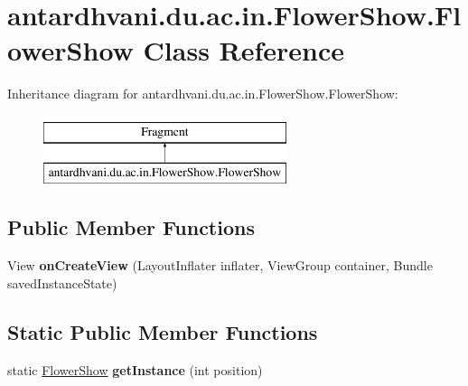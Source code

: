 \hypertarget{classantardhvani_1_1du_1_1ac_1_1in_1_1_flower_show_1_1_flower_show}{}\section{antardhvani.\+du.\+ac.\+in.\+Flower\+Show.\+Flower\+Show Class Reference}
\label{classantardhvani_1_1du_1_1ac_1_1in_1_1_flower_show_1_1_flower_show}
Inheritance diagram for antardhvani.\+du.\+ac.\+in.\+Flower\+Show.\+Flower\+Show\+:\begin{figure}[H]
\begin{center}
\leavevmode
\includegraphics[height=2.000000cm]{classantardhvani_1_1du_1_1ac_1_1in_1_1_flower_show_1_1_flower_show}
\end{center}
\end{figure}
\subsection*{Public Member Functions}
\begin{DoxyCompactItemize}
\item 
\hypertarget{classantardhvani_1_1du_1_1ac_1_1in_1_1_flower_show_1_1_flower_show_a910f1fcce02fca66aa707c23190f8af4}{}View {\bfseries on\+Create\+View} (Layout\+Inflater inflater, View\+Group container, Bundle saved\+Instance\+State)\label{classantardhvani_1_1du_1_1ac_1_1in_1_1_flower_show_1_1_flower_show_a910f1fcce02fca66aa707c23190f8af4}

\end{DoxyCompactItemize}
\subsection*{Static Public Member Functions}
\begin{DoxyCompactItemize}
\item 
\hypertarget{classantardhvani_1_1du_1_1ac_1_1in_1_1_flower_show_1_1_flower_show_a75a29da2edfd92d395852765778a905e}{}static \hyperlink{classantardhvani_1_1du_1_1ac_1_1in_1_1_flower_show_1_1_flower_show}{Flower\+Show} {\bfseries get\+Instance} (int position)\label{classantardhvani_1_1du_1_1ac_1_1in_1_1_flower_show_1_1_flower_show_a75a29da2edfd92d395852765778a905e}

\end{DoxyCompactItemize}
